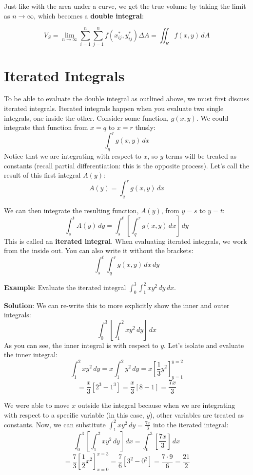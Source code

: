 Just like with the area under a curve, we get the true volume by taking the
limit as $n \to \infty$, which becomes a \textbf{double integral}:

\begin{mdframed}[style = important, frametitle = {Volume of a Solid over a 
Region}]
$$V_{\textit{S}} = \lim_{n \to \infty} \sum_{i = 1}^n \sum_{j = 1}^n f(x_{ij}^*
, y_{ij}^*) \Delta A = \iint_{\textit{R}} f(x, y)\,dA$$
\end{mdframed}


\section{Iterated Integrals}

To be able to evaluate the double integral as outlined above, we must first 
discuss iterated integrals. Iterated integrals happen when you evaluate two 
single integrals, one inside the other. Consider some function, $g(x, y)$. We 
could integrate that function from $x = q$ to $x = r$ thusly:
$$\int_q^r g(x, y)\,dx$$
Notice that we are integrating with respect to $x$, so $y$ terms will be 
treated as constants (recall partial differentiation: this is the opposite 
process). Let's call the result of this first integral $A(y)$:
$$A(y) = \int_q^r g(x, y)\,dx$$

We can then integrate the resulting function, $A(y)$, from $y = s$ to $y = t$:
$$\int_s^t A(y)\,dy = \int_s^t \left[ \int_q^r g(x, y)\,dx \right]\,dy$$
This is called an \textbf{iterated integral}. When 
evaluating iterated integrals, we work from the inside out. You can also write 
it without the brackets:
$$\int_s^t \int_q^r g(x, y)\,dx\,dy$$

\textbf{Example}: Evaluate the iterated integral $\int_0^3 \int_1^2 x y^2\,dy
\,dx$.

\textbf{Solution}: We can re-write this to more explicitly show the inner and 
outer integrals:
$$\int_0^3 \left[ \int_1^2 x y^2\,dy \right]\,dx$$
As you can see, the inner integral is with respect to $y$. Let's isolate and 
evaluate the inner integral:
$$\int_1^2 x y^2\,dy = x \int_1^2 y^2\,dy = x \left[ \frac{1}{3}y^2 \right]_{y 
= 1}^{y = 2}$$
$$= \frac{x}{3} \left[ 2^3 - 1^3 \right] = \frac{x}{3} \left[ 8 - 1 \right] = 
\frac{7x}{3}$$

We were able to move $x$ outside the integral because when we are integrating 
with respect to a specific variable (in this case, $y$), other variables are 
treated as constants. Now, we can substitute $\int_1^2 xy^2 \,dy = \frac{7x}{3}$
into the iterated integral:
$$\int_0^3 \left[ \int_1^2 x y^2\,dy \right]\,dx = \int_0^3 \left[ \frac{7x}{3}
\right]\,dx$$
$$= \frac{7}{3} \left[ \frac{1}{2}x^2 \right]_{x = 0}^{x = 3} = \frac{7}{6} 
\left[ 3^2 - 0^2 \right] = \frac{7 \cdot 9}{6} = \frac{21}{2}$$

